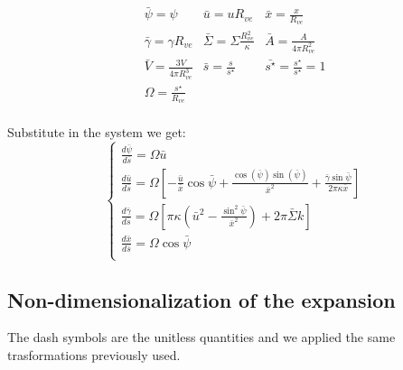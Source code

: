 \documentclass[12pt]{article}
\begin{document}
\[
\begin{array}{ccc}
\bar{\psi} = \psi & \bar{u} = u R_{ve} & \bar{x} = \frac{x}{R_{ve}} \\[15pt]
\bar{\gamma} = \gamma R_{ve} & \bar{\Sigma} = \Sigma \frac{R_{ve}^2}{\kappa} & \bar{A} = \frac{A}{4 \pi R_{ve}^2 } \\[15pt]
\bar{V} = \frac{3V}{4 \pi R_{ve}^3 } & \bar{s} = \frac{s}{s^\star} & \bar{s^\star} = \frac{s^\star}{s^\star} = 1 \\[15pt]
\Omega = \frac{s^\star}{R_{ve}} & & \\
\end{array}
\]
 

Substitute in the system we get:
\begin{equation}
  \begin{cases} 
    
    \frac{d\bar{\psi}}{d\bar{s}} = \Omega \bar{u} \\[3mm]
    \frac{d\bar{u}}{d\bar{s}} = \Omega [-\frac{\bar{u}}{\bar{x}}\cos\bar{\psi}+\frac{\cos(\bar{\psi})\sin(\bar{\psi})}{\bar{x}^2}+\frac{\bar{\gamma}\sin \bar{\psi}}{2\pi \kappa \bar{x}}] \\[3mm]
    \frac{d\bar{\gamma}}{d\bar{s}} = \Omega [\pi \kappa (\bar{u}^2-\frac{\sin^2 \bar{\psi}}{\bar{x}^2})+2 \pi \bar{\Sigma} k] \\[3mm]
    \frac{d\bar{x}}{d\bar{s}} = \Omega \cos \bar{\psi} \\[3mm]
  \end{cases}
\end{equation}









\subsection{Non-dimensionalization of the expansion}
The dash symbols are the unitless quantities and we applied the same trasformations previously used.
\end{document}
